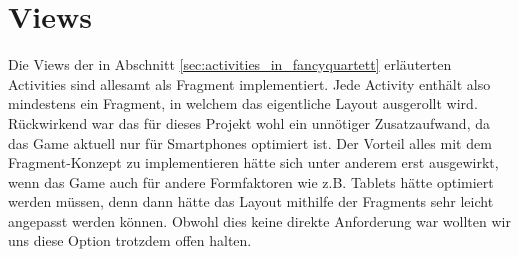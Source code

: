 \section{Views}
Die Views der in Abschnitt \ref{sec:activities_in_fancyquartett} erläuterten Activities sind allesamt als Fragment implementiert. Jede Activity enthält also mindestens ein Fragment, in welchem das eigentliche Layout ausgerollt wird. Rückwirkend war das für dieses Projekt wohl ein unnötiger Zusatzaufwand, da das Game aktuell nur für Smartphones optimiert ist. Der Vorteil alles mit dem Fragment-Konzept zu implementieren hätte sich unter anderem erst ausgewirkt, wenn das Game auch für andere Formfaktoren wie z.B. Tablets hätte optimiert werden müssen, denn dann hätte das Layout mithilfe der Fragments sehr leicht angepasst werden können. Obwohl dies keine direkte Anforderung war wollten wir uns diese Option trotzdem offen halten.




